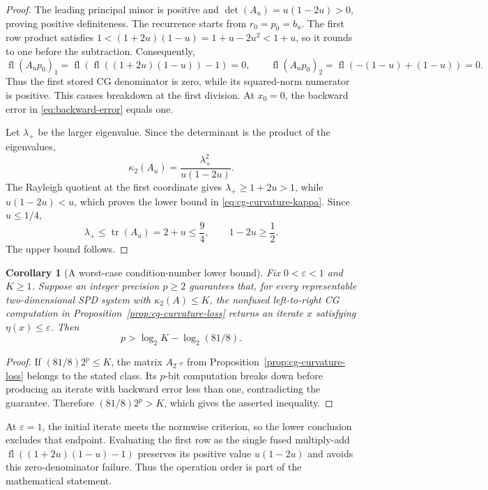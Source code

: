 \documentclass[11pt]{article}
\newtheorem{corollary}{Corollary}
\theoremstyle{definition}
\newcommand{\fl}{\operatorname{fl}}
\begin{document}
\begin{proof}
The leading principal minor is positive and
$\det(A_u)=u(1-2u)>0$, proving positive definiteness.  The recurrence
starts from $r_0=p_0=b_u$.  The first row product satisfies
$1<(1+2u)(1-u)=1+u-2u^2<1+u$, so it rounds to one before the
subtraction.  Consequently,
\[
 \fl(A_up_0)_1
 =\fl\!\left(\fl((1+2u)(1-u))-1\right)=0,
 \qquad
 \fl(A_up_0)_2=\fl(-(1-u)+(1-u))=0.
\]
Thus the first stored CG denominator is zero, while its squared-norm
numerator is positive.  This causes breakdown at the first division.
At $x_0=0$, the backward error in
\eqref{eq:backward-error} equals one.

Let $\lambda_+$ be the larger eigenvalue.  Since the determinant is the product
of the eigenvalues,
\[
 \kappa_2(A_u)=\frac{\lambda_+^2}{u(1-2u)}.
\]
The Rayleigh quotient at the first coordinate gives $\lambda_+\ge1+2u>1$,
while $u(1-2u)<u$, which proves the lower bound in
\eqref{eq:cg-curvature-kappa}.  Since $u\le1/4$,
\[
 \lambda_+\le\operatorname{tr}(A_u)=2+u\le\frac94,
 \qquad 1-2u\ge\frac12.
\]
The upper bound follows.
\end{proof}

\begin{corollary}[A worst-case condition-number lower bound]
\label{cor:cg-curvature-bit-lower}
Fix $0<\varepsilon<1$ and $K\ge1$.  Suppose an integer precision $p\ge2$
guarantees that, for every representable two-dimensional SPD system
with $\kappa_2(A)\le K$, the nonfused left-to-right CG computation in
Proposition~\ref{prop:cg-curvature-loss} returns an iterate $x$
satisfying $\eta(x)\le\varepsilon$.  Then
\begin{equation}
 p>\log_2K-\log_2(81/8).
 \label{eq:cg-curvature-bit-lower}
\end{equation}
\end{corollary}

\begin{proof}
If $(81/8)2^p\le K$, the matrix $A_{2^{-p}}$ from
Proposition~\ref{prop:cg-curvature-loss} belongs to the stated class.
Its $p$-bit computation breaks down before producing an iterate with
backward error less than one, contradicting the guarantee.
Therefore $(81/8)2^p>K$, which gives the asserted inequality.
\end{proof}

At $\varepsilon=1$, the initial iterate meets the normwise criterion, so the
lower conclusion excludes that endpoint.  Evaluating the first row as the
single fused multiply-add $\fl((1+2u)(1-u)-1)$ preserves its positive
value $u(1-2u)$ and avoids this zero-denominator failure.
Thus the operation order is part of the mathematical statement.
\end{document}
